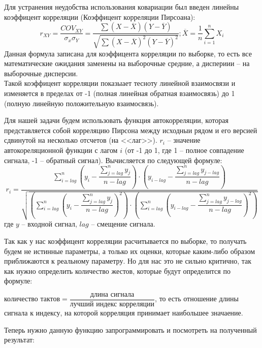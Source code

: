 Для устранения неудобства использования ковариации был введен линейны коэффицент корреляции (Коэффицент корреляции Пирсоана):
\[r_{XY} = \dfrac{COV_{XY}}{\sigma_x \sigma_Y} = \dfrac{\sum (X - \overline{X}) (Y - \overline{Y})}{ \sqrt{\sum (X - \overline{X})^2 (Y - \overline{Y}) ^2} }; \overline{X} = \dfrac{1}{n} \sum_{i = 1}^n X_i\]
Данная формула записана для коэффицента корреляции по выборке, то есть все математические ожидания заменены на выборочные средние, а диспериии -- на выборочные дисперсии. \\
Такой коэффицент корреляции показыает тесноту линейной взаимосвязи и изменяется в пределах от -1 (полная линейная обратная взаимосвязь) до 1 (полную линейную положительную взаимосвязь).

Для нашей задачи будем использовать функция автокорреляции, которая представляется собой корреляцию Пирсона между исходныи рядом и его версией сдвинутой на несколько отсчетов (на <<лаг>>). $r_i$ -- значение автокореляционной функции с лагом $i$ (от -1 до 1, где 1 -- полное совпадение сигнала, -1 -- обратный сигнал). Вычисляется по следующей формуле:
\[r_i = \dfrac{\sum_{i = lag}^n \left(y_i - \dfrac{\sum_{j = lag}^n y_j}{n - lag} \right) \cdot \left(y_{i-lag} - \dfrac{\sum_{j = lag}^n y_{j - lag}}{n - lag} \right)}{\sqrt{ \left( \sum_{i = lag}^n \left(y_i - \dfrac{\sum_{j = lag}^n y_j}{n - lag} \right)^2 \right) \cdot \left( \sum_{i = lag}^n \left(y_{i - lag} - \dfrac{\sum_{j = lag}^n y_{j-lag}}{n - lag} \right)^2 \right) }}\]
где $y$ -- входной сигнал, $lag$ -- смещение сигнала.

Так как у нас коэффицент корреляции расчитывается по выборке, то получать будем не истинные параметры, а только их оценки, которые каким-либо образом приближаются к реальному параметру. Но для нас это не сильно критично, так как нужно определить количество жестов, которые будут определится по формуле:

$\text{количество тактов} = \dfrac{\text{длина сигнала}}{\text{лучший индекс корреляции}}$, то есть отношение длины сигнала к индексу, на которой корреляция принимает наибольшее значаение.

Теперь нужно данную функцию запрограммировать и посмотреть на полученный результат:

\begin{figure}[H]
\end{figure}

